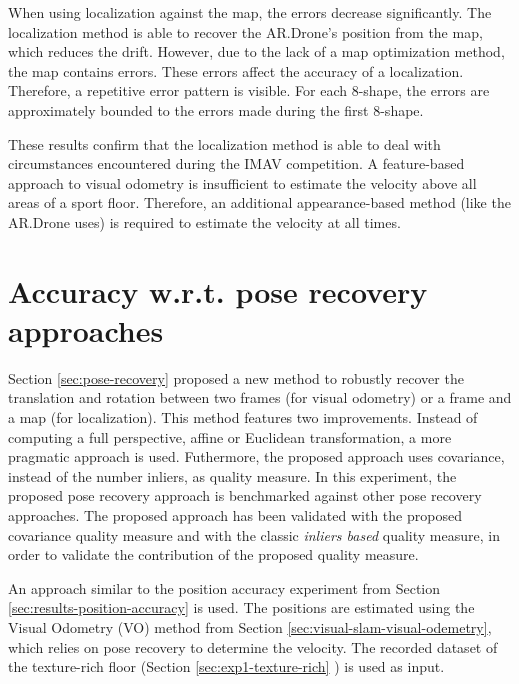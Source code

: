 When using localization against the map, the errors decrease significantly.
The localization method is able to recover the AR.Drone's position from the map, which reduces the drift.
However, due to the lack of a map optimization method, the map contains errors.
These errors affect the accuracy of a localization.
Therefore, a repetitive error pattern is visible.
For each 8-shape, the errors are approximately bounded to the errors made during the first 8-shape.

These results confirm that the localization method is able to deal with circumstances encountered during the IMAV competition.
A feature-based approach to visual odometry is insufficient to estimate the velocity above all areas of a sport floor.
Therefore, an additional appearance-based method (like the AR.Drone uses) is required to estimate the velocity at all times.


\clearpage
\section{Accuracy w.r.t. pose recovery approaches}
\label{sec:results-pose-recovery}
Section \ref{sec:pose-recovery} proposed a new method to robustly recover the translation and rotation between two frames (for visual odometry) or a frame and a map (for localization).
This method features two improvements.
Instead of computing a full perspective, affine or Euclidean transformation, a more pragmatic approach is used.
Futhermore, the proposed approach uses covariance, instead of the number inliers, as quality measure.
In this experiment, the proposed pose recovery approach is benchmarked against other pose recovery approaches.
The proposed approach has been validated with the proposed covariance quality measure and with the classic \textit{inliers based} quality measure, in order to validate the contribution of the proposed quality measure.

An approach similar to the position accuracy experiment from Section \ref{sec:results-position-accuracy} is used.
The positions are estimated using the Visual Odometry (VO) method from Section \ref{sec:visual-slam-visual-odemetry}, which relies on pose recovery to determine the velocity.
The recorded dataset of the texture-rich floor (Section \ref{sec:exp1-texture-rich} ) is used as input.
 
